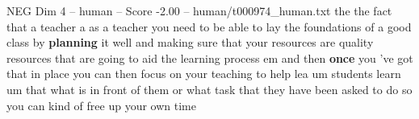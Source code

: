 \begin{textsample}{NEG Dim 4 – human – Score -2.00 – human/t000974\_human.txt}  \label{ex:f4_neg_037}
the the fact that a teacher a as a teacher you need to be able to lay the foundations of a good class by \textbf{planning} it well and making sure that your resources are quality resources that are going to aid the learning process em and then \textbf{once} you 've got that in place you can then focus on your teaching to help lea um students learn um that what is in front of them or what task that they have been asked to do so you can kind of free up your own time

\end{textsample}
